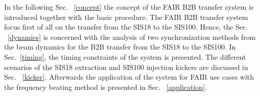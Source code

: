 In the following Sec. ~\ref{concept} the concept of the FAIR B2B transfer system is introduced together with the basic procedure. The FAIR B2B transfer system focus first of all on the transfer from the SIS18 to the SIS100. Hence, the Sec. ~\ref{dynamics} is concerned with the analysis of two synchronization methods from the beam dynamics for the B2B transfer from the SIS18 to the SIS100. In Sec.~\ref{timing}, the timing constraints of the system is presented. The different scenarios of the SIS18 extraction and SIS100 injection kickers are discussed in Sec. ~\ref{kicker}. Afterwards the application of the system for FAIR use cases with the frequency beating method is presented in Sec. ~\ref{application}.



